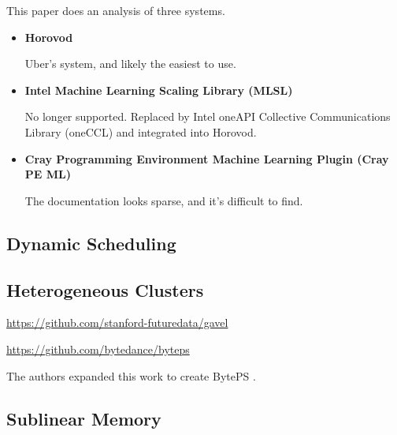 
This paper does an analysis of three systems.

\begin{itemize}
  \item \textbf{Horovod}

    Uber's system, and likely the easiest to use.
  \item \textbf{Intel Machine Learning Scaling Library (MLSL)}

    No longer supported. Replaced by Intel oneAPI Collective Communications
    Library (oneCCL) and integrated into Horovod.
  \item \textbf{Cray Programming Environment Machine Learning Plugin (Cray PE
    ML)}

    The documentation looks sparse, and it's difficult to find.
\end{itemize}


\subsection{Dynamic Scheduling}




\subsection{Heterogeneous Clusters}


\url{https://github.com/stanford-futuredata/gavel}


\url{https://github.com/bytedance/byteps}


The authors expanded this work to create BytePS \cite{osdi/2020/jiang}.

\subsection{Sublinear Memory}


